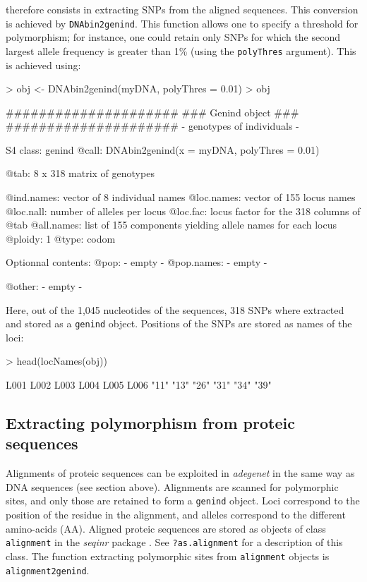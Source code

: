 \documentclass{article}
\begin{document}
therefore consists in extracting SNPs from the aligned sequences.
This conversion is achieved by \texttt{DNAbin2genind}.
This function allows one to specify a threshold for polymorphism; for instance, one could retain
only SNPs for which the second largest allele frequency is greater than 1\% (using the \texttt{polyThres} argument).
This is achieved using:
\begin{Schunk}
\begin{Sinput}
> obj <- DNAbin2genind(myDNA, polyThres = 0.01)
> obj
\end{Sinput}
\begin{Soutput}
   #####################
   ### Genind object ### 
   #####################
- genotypes of individuals - 

S4 class:  genind
@call: DNAbin2genind(x = myDNA, polyThres = 0.01)

@tab:  8 x 318 matrix of genotypes

@ind.names: vector of  8 individual names
@loc.names: vector of  155 locus names
@loc.nall: number of alleles per locus
@loc.fac: locus factor for the  318 columns of @tab
@all.names: list of  155 components yielding allele names for each locus
@ploidy:  1
@type:  codom

Optionnal contents: 
@pop:  - empty -
@pop.names:  - empty -

@other: - empty -
\end{Soutput}
\end{Schunk}
Here, out of the 1,045 nucleotides of the sequences, 318 SNPs where extracted and stored as a
\texttt{genind} object.
Positions of the SNPs are stored as names of the loci:
\begin{Schunk}
\begin{Sinput}
> head(locNames(obj))
\end{Sinput}
\begin{Soutput}
L001 L002 L003 L004 L005 L006 
"11" "13" "26" "31" "34" "39" 
\end{Soutput}
\end{Schunk}





\subsection{Extracting polymorphism from proteic sequences}
Alignments of proteic sequences can be exploited in \textit{adegenet} in the same way as DNA sequences (see
section above).
Alignments are scanned for polymorphic sites, and only those are retained to form a \texttt{genind} object.
Loci correspond to the position of the residue in the alignment, and alleles correspond to the
different amino-acids (AA).
Aligned proteic sequences are stored as objects of class \texttt{alignment} in the \emph{seqinr}
package \cite{np160}.
See \texttt{?as.alignment} for a description of this class.
The function extracting polymorphic sites from \texttt{alignment} objects is \texttt{alignment2genind}.
\end{document}
